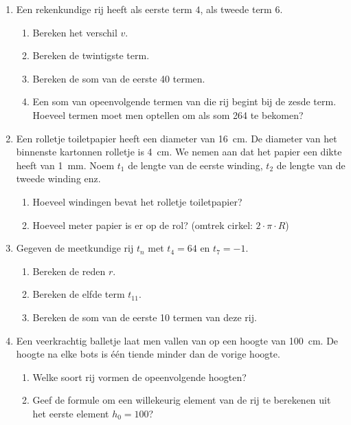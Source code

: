 \begin{enumerate}
    \item  Een rekenkundige rij heeft als eerste term $4$, als tweede term $6$.
    \begin{enumerate}
        \item Bereken het verschil $v$. 
        \item Bereken de twintigste term.

        \item  Bereken de som van de eerste 40 termen.

        \item  Een som van opeenvolgende termen van die rij begint
        bij de zesde term. Hoeveel termen moet
        men optellen om als som 264 te bekomen?
    \end{enumerate}

    \item  Een rolletje toiletpapier heeft een diameter van \SI{16}{\centi\meter}. De
    diameter van het binnenste kartonnen rolletje is \SI{4}{\centi\meter}. We nemen
    aan dat het papier een dikte heeft van \SI{1}{\milli\meter}. Noem $t_{1}$ de
    lengte van de eerste winding, $t_{2}$ de lengte van de
    tweede winding enz.
    \begin{enumerate}
        \item  Hoeveel windingen bevat het rolletje
        toiletpapier?

        \item  Hoeveel meter papier is er op de rol? (omtrek
        cirkel: $2 \cdot \pi \cdot R$)
    \end{enumerate}

    \item  Gegeven de meetkundige rij $t_{n}$ met $t_{4}=64$ en $t_{7}=-1$.
    \begin{enumerate}
        \item  Bereken de reden $r$.
        \item Bereken de elfde term $t_{11}$.

        \item  Bereken de som van de eerste 10 termen van deze rij.
    \end{enumerate}

    \item  Een veerkrachtig balletje laat men vallen van op een hoogte
    van \SI{100}{\centi\meter}. De hoogte na elke bots is \'{e}\'{e}n tiende
    minder dan de vorige hoogte.
    \begin{enumerate}
        \item  Welke soort rij vormen de opeenvolgende
        hoogten? 
        \item Geef de formule om een willekeurig element van de
    rij te berekenen uit het eerste element $h_{0}=100$?


\end{enumerate}
\end{enumerate}
